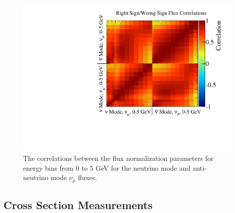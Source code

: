 \begin{figure}[htpb]
\begin{center}
  \begin{minipage}[t]{.45\textwidth}
    \begin{center}
      \includegraphics[width=\textwidth] {figures/right_wrong_sign_flux_correlations.pdf}
    \end{center}
  \end{minipage}
\end{center}
\caption{The correlations between the flux normalization parameters for energy bins from 0 to 5 GeV for the neutrino mode and anti-neutrino mode $\nu_{\mu}$ fluxes. }
\label{fig:wrongsignflux}
\end{figure}



\subsection{Cross Section Measurements}
\label{sec:xsec}

